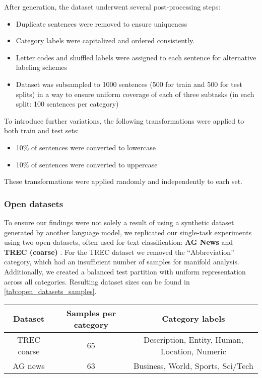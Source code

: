 After generation, the dataset underwent several post-processing steps:

\begin{itemize}
    \item Duplicate sentences were removed to ensure uniqueness
    \item Category labels were capitalized and ordered consistently.
    \item Letter codes and shuffled labels were assigned to each sentence for alternative labeling schemes
    \item Dataset was subsampled to 1000 sentences (500 for train and 500 for test splits) in a way to ensure uniform coverage of each of three subtasks (in each split: 100 sentences per category)
\end{itemize}


To introduce further variations, the following transformations were applied to both train and test sets:
\begin{itemize}
\item 10\% of sentences were converted to lowercase
\item 10\% of sentences were converted to uppercase
\end{itemize}
These transformations were applied randomly and independently to each set.




\subsubsection{Open datasets}

To ensure our findings were not solely a result of using a synthetic dataset generated by another language model, we replicated our single-task experiments using two open datasets, often used for text classification: \textbf{AG News} \cite{Zhang2015CharacterlevelCN}and \textbf{TREC (coarse)} \cite{li-roth-2002-learning, hovy-etal-2001-toward}. For the TREC dataset we removed the ``Abbreviation'' category, which had an insufficient number of samples for manifold analysis. Additionally, we created a balanced test partition with uniform representation across all categories. Resulting dataset sizes can be found in \cref{tab:open_datasets_samples}.

\begin{table*}[ht]
    \centering
    \begin{tabular}{c|c|c}
        \textbf{Dataset} & \textbf{Samples per category} & \textbf{Category labels} \\  \hline
        TREC coarse & 65 & Description, Entity, Human, Location, Numeric \\  \hline
        
        AG news & 63 & Business, World, Sports, Sci/Tech \\  \hline
    \end{tabular}
    \caption{Parameters of open dataset subsampling sizes used in experiments}
    \label{tab:open_datasets_samples}
\end{table*}